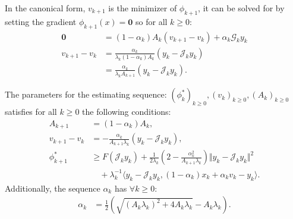 \documentclass[12pt]{article}
\begin{document}
        In the canonical form, $v_{k + 1}$ is the minimizer of $\phi_{k + 1}$, it can be solved for by setting the gradient $\phi_{k + 1}(x)= \mathbf 0$ so for all $k\ge 0$: 
        \begin{align*}
            \mathbf 0 &= (1 - \alpha_k)A_k(v_{k + 1} - v_k) + \alpha_k \mathcal G_k y_k
            \\
            v_{k + 1} - v_k &= 
            \frac{\alpha_k}{\lambda_k(1 - \alpha_k)A_k}
            \left(
                y_k - \mathcal J_k y_k
            \right)
            \\
            &= \frac{\alpha_k}{\lambda_kA_{k + 1}}
            \left(
                y_k - \mathcal J_k y_k
            \right). 
        \end{align*}
        \begin{theorem}\label{app:thm:est-seq-acc-ppm}
            The parameters for the estimating sequence: $(\phi_k^*)_{k\ge 0}, (v_k)_{k\ge 0}, (A_k)_{k\ge 0}$ satisfies for all $k \ge0 $ the following conditions:
            \begin{align*}
                A_{k + 1} &= (1 - \alpha_k)A_k, 
                \\
                v_{k + 1} - v_k
                &= 
                - \frac{\alpha_k}{A_{k + 1}\lambda_k}(y_k - \mathcal J_k y_k), 
                \\
                \phi_{k + 1}^*
                &\ge 
                F(\mathcal J_ky_k) + 
                \frac{1}{2\lambda_k}\left(
                    2 - \frac{\alpha_k^2}{A_{k + 1}\lambda_k}
                \right)
                \Vert y_k - \mathcal J_k y_k\Vert^2
                \\
                    & \quad 
                    + 
                    \lambda_k^{-1}
                    \langle 
                        y_k - \mathcal J_k y_k, (1 - \alpha_k)x_k + \alpha_k v_k - y_k
                    \rangle.
            \end{align*}
            Additionally, the sequence $\alpha_k$ has $\forall k \ge0$: 
            \begin{align*}
                \alpha_k
                &= 
                \frac{1}{2}\left(
                    \sqrt{(A_k\lambda_k)^2 + 4A_k \lambda_k}
                    - A_k\lambda_k
                \right). 
            \end{align*}
        \end{theorem}
\end{document}
